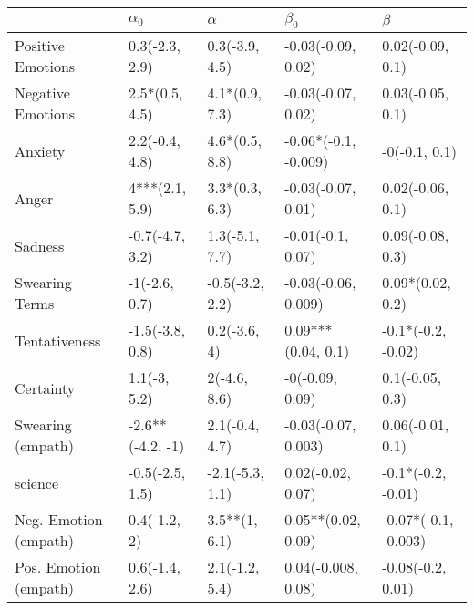 \begin{tabular}{lllll}
\toprule
{} &        $\alpha_0$ &         $\alpha$ &             $\beta_0$ &               $\beta$ \\
\midrule
Positive Emotions     &    0.3(-2.3, 2.9) &   0.3(-3.9, 4.5) &    -0.03(-0.09, 0.02) &      0.02(-0.09, 0.1) \\
Negative Emotions     &    2.5*(0.5, 4.5) &   4.1*(0.9, 7.3) &    -0.03(-0.07, 0.02) &      0.03(-0.05, 0.1) \\
Anxiety               &    2.2(-0.4, 4.8) &   4.6*(0.5, 8.8) &  -0.06*(-0.1, -0.009) &         -0(-0.1, 0.1) \\
Anger                 &    4***(2.1, 5.9) &   3.3*(0.3, 6.3) &    -0.03(-0.07, 0.01) &      0.02(-0.06, 0.1) \\
Sadness               &   -0.7(-4.7, 3.2) &   1.3(-5.1, 7.7) &     -0.01(-0.1, 0.07) &      0.09(-0.08, 0.3) \\
Swearing Terms        &     -1(-2.6, 0.7) &  -0.5(-3.2, 2.2) &   -0.03(-0.06, 0.009) &      0.09*(0.02, 0.2) \\
Tentativeness         &   -1.5(-3.8, 0.8) &     0.2(-3.6, 4) &    0.09***(0.04, 0.1) &    -0.1*(-0.2, -0.02) \\
Certainty             &      1.1(-3, 5.2) &     2(-4.6, 8.6) &       -0(-0.09, 0.09) &       0.1(-0.05, 0.3) \\
Swearing (empath)     &  -2.6**(-4.2, -1) &   2.1(-0.4, 4.7) &   -0.03(-0.07, 0.003) &      0.06(-0.01, 0.1) \\
science               &   -0.5(-2.5, 1.5) &  -2.1(-5.3, 1.1) &     0.02(-0.02, 0.07) &    -0.1*(-0.2, -0.01) \\
Neg. Emotion (empath) &      0.4(-1.2, 2) &    3.5**(1, 6.1) &    0.05**(0.02, 0.09) &  -0.07*(-0.1, -0.003) \\
Pos. Emotion (empath) &    0.6(-1.4, 2.6) &   2.1(-1.2, 5.4) &    0.04(-0.008, 0.08) &     -0.08(-0.2, 0.01) \\
\bottomrule
\end{tabular}
